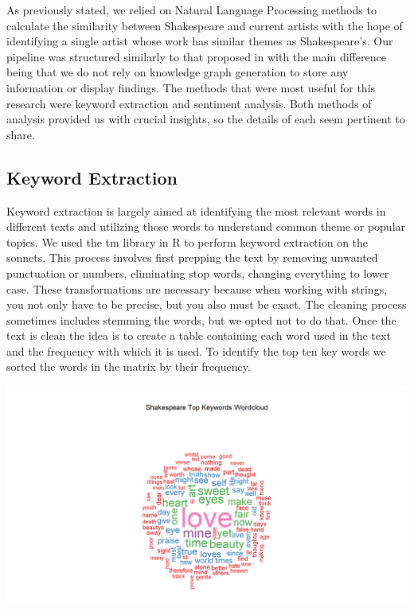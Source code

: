 \documentclass[11pt]{article}
\begin{document}
\noindent As previously stated, we relied on Natural Language Processing methods to calculate the similarity between Shakespeare and current artists with the hope of identifying a single artist whose work has similar themes as Shakespeare’s. Our pipeline was structured similarly to that proposed in \cite{NLP-for-music} with the main difference being that we do not rely on knowledge graph generation to store any information or display findings. The methods that were most useful for this research were keyword extraction and sentiment analysis. Both methods of analysis provided us with crucial insights, so the details of each seem pertinent to share. 

\subsection{Keyword Extraction}
Keyword extraction is largely aimed at identifying the most relevant words in different texts and utilizing those words to understand common theme or popular topics.\cite{monkey} We used the tm library in R to perform keyword extraction\cite{tm} on the sonnets. This process involves first prepping the text by removing unwanted punctuation or numbers, eliminating stop words, changing everything to lower case. These transformations are necessary because when working with strings, you not only have to be precise, but you also must be exact. The cleaning process sometimes includes stemming the words, but we opted not to do that. Once the text is clean the idea is to create a table containing each word used in the text and the frequency with which it is used. To identify the top ten key words we sorted the words in the matrix by their frequency. 
\begin{center}
\includegraphics[width=14cm]{_assets/Shakespeare_Keywords_WordCloud.png}
\end{center}
\end{document}
